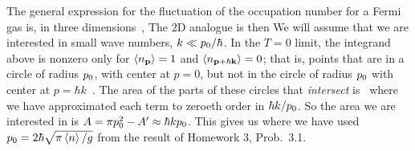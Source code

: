 {	The general expression for the fluctuation of the occupation number for a Fermi gas is, in three dimensions~\cite[p.~356]{Landau2},
	The 2D analogue is then
	We will assume that we are interested in small wave numbers, $k \ll p_0 / \hbar$.  In the $T =  0$ limit, the integrand above is nonzero only for $\ev{n_{\vp}} = 1$ and $\ev{n_{\vp + \hbar \vk}} = 0$; that is, points that are in a circle of radius $p_0$, with center at $p = 0$, but not in the circle of radius $p_0$ with center at $p = \hbar k$~\cite[p.~357]{Landau}.  The area of the parts of these circles that \emph{intersect} is~\cite{Intersection}
	where we have approximated each term to zeroeth order in $\hbar k / p_0$.  So the area we are interested in is $A = \pi p_0^2 - A' \approx \hbar k p_0$.  This gives us
	where we have used $\po = 2\hbar \sqrt{\pi \evn / g}$ from the result of Homework 3, Prob.~{3.1}.
}


%
%
\clearpage
{}

